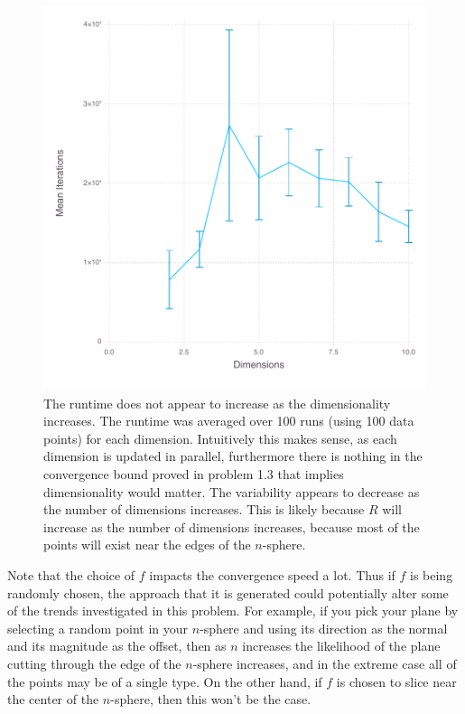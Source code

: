\documentclass[11pt,letterpaper]{article}
\begin{document}
\begin{figure}
	\centering
    \includegraphics[width=\textwidth]{problem_1_4h.pdf}
	\caption{The runtime does not appear to increase as the dimensionality increases.  The runtime was averaged over 100 runs (using 100 data points) for each dimension.  Intuitively this makes sense, as each dimension is updated in parallel, furthermore there is nothing in the convergence bound proved in problem 1.3 that implies dimensionality would matter.  The variability appears to decrease as the number of dimensions increases.  This is likely because $R$ will increase as the number of dimensions increases, because most of the points will exist near the edges of the $n$-sphere.}
\end{figure}

Note that the choice of $f$ impacts the convergence speed a lot.  Thus if $f$ is being randomly chosen, the approach that it is generated could potentially alter some of the trends investigated in this problem.  For example, if you pick your plane by selecting a random point in your $n$-sphere and using its direction as the normal and its magnitude as the offset, then as $n$ increases the likelihood of the plane cutting through the edge of the $n$-sphere increases, and in the extreme case all of the points may be of a single type.  On the other hand, if $f$ is chosen to slice near the center of the $n$-sphere, then this won't be the case.
\end{document}
